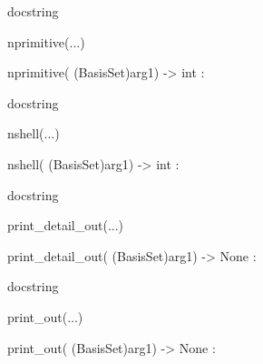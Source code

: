 \documentclass[letterpaper,10pt,english]{sphinxmanual}
\begin{document}
\begin{description}
\begin{description}
\begin{DUlineblock}{0em}
\begin{DUlineblock}{\DUlineblockindent}
\item[]
\begin{DUlineblock}{\DUlineblockindent}
\item[] docstring
\item[] 
\end{DUlineblock}
\end{DUlineblock}
\item[] nprimitive(...)
\item[]
\begin{DUlineblock}{\DUlineblockindent}
\item[] nprimitive( (BasisSet)arg1) -\textgreater{} int :
\item[]
\begin{DUlineblock}{\DUlineblockindent}
\item[] docstring
\item[] 
\end{DUlineblock}
\end{DUlineblock}
\item[] nshell(...)
\item[]
\begin{DUlineblock}{\DUlineblockindent}
\item[] nshell( (BasisSet)arg1) -\textgreater{} int :
\item[]
\begin{DUlineblock}{\DUlineblockindent}
\item[] docstring
\item[] 
\end{DUlineblock}
\end{DUlineblock}
\item[] print\_detail\_out(...)
\item[]
\begin{DUlineblock}{\DUlineblockindent}
\item[] print\_detail\_out( (BasisSet)arg1) -\textgreater{} None :
\item[]
\begin{DUlineblock}{\DUlineblockindent}
\item[] docstring
\item[] 
\end{DUlineblock}
\end{DUlineblock}
\item[] print\_out(...)
\item[]
\begin{DUlineblock}{\DUlineblockindent}
\item[] print\_out( (BasisSet)arg1) -\textgreater{} None :
\item[]

\end{DUlineblock}
\end{DUlineblock}
\end{description}
\end{description}
\end{document}
